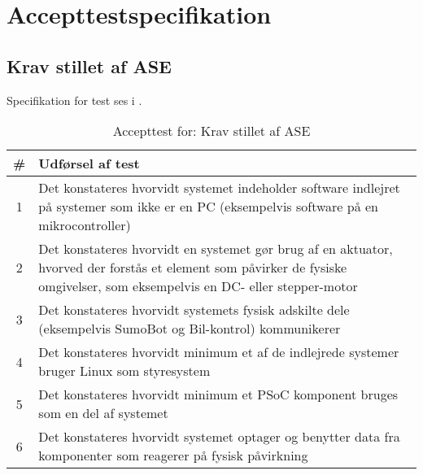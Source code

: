 \section{Accepttestspecifikation}
\tbr
\subsection{Krav stillet af ASE}
Specifikation for test ses i .
\begin{table}[]
\centering
\caption{Accepttest for: Krav stillet af ASE}\label{tab:ASEKrav}
\begin{tabular}{c p{7cm}}\toprule
\# & \textbf{Udførsel af test} \\ \midrule
1 & Det konstateres hvorvidt systemet indeholder software indlejret på systemer som ikke er en PC (eksempelvis software på en mikrocontroller)\\\midrule
2 & Det konstateres hvorvidt en systemet gør brug af en aktuator, hvorved der forstås et element som påvirker de fysiske omgivelser, som eksempelvis en DC- eller stepper-motor \\\midrule
3 & Det konstateres hvorvidt systemets fysisk adskilte dele (eksempelvis SumoBot og Bil-kontrol) kommunikerer\\\midrule
4 & Det konstateres hvorvidt minimum et af de indlejrede systemer bruger Linux som styresystem \\\midrule
5 & Det konstateres hvorvidt minimum et PSoC komponent bruges som en del af systemet\\\midrule
6 & Det konstateres hvorvidt systemet optager og benytter data fra komponenter som reagerer på fysisk påvirkning\\\bottomrule
\end{tabular}
\end{table}

